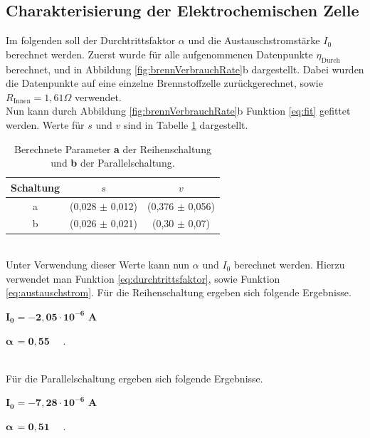 \documentclass[a4paper,usenatbib]{aspdoc}
\begin{document}
        \subsection{Charakterisierung der Elektrochemischen Zelle}\label{subsec:char_zel}
            Im folgenden soll der Durchtrittsfaktor $\alpha$ und die Austauschstromstärke $I_0$ berechnet werden. Zuerst wurde für alle aufgenommenen Datenpunkte $\eta_{\mathrm{Durch}}$ berechnet, und in Abbildung \ref{fig:brennVerbrauchRate}b dargestellt. Dabei wurden die Datenpunkte auf eine einzelne Brennstoffzelle zurückgerechnet, sowie $R_{\mathrm{Innen}} = 1,61 \Omega$ verwendet.
            \\
            Nun kann durch Abbildung \ref{fig:brennVerbrauchRate}b Funktion \ref{eq:fit} gefittet werden. Werte für $s$ und $v$ sind in Tabelle \ref{tab:fittingVal} dargestellt.
            \begin{table}
                \centering
                \begin{tabular}{c|c|c}
                    \multicolumn{1}{c}{Schaltung} & \multicolumn{1}{c}{$s$} & \multicolumn{1}{c}{$v$}\\
                    \cmidrule(lr){1-1}\cmidrule(lr){2-2}\cmidrule(lr){3-3}
                    \toprule
                    a & (0,028 $\pm$ 0,012) & (0,376 $\pm$ 0,056) \\
                    b & (0,026 $\pm$ 0,021) & (0,30 $\pm$ 0,07) \\
                    \bottomrule
                \end{tabular}
                \caption{Berechnete Parameter \textbf{a} der Reihenschaltung und \textbf{b} der Parallelschaltung.}
                \label{tab:fittingVal}
            \end{table}
            \\
            Unter Verwendung dieser Werte kann nun $\alpha$ und $I_0$ berechnet werden. Hierzu verwendet man Funktion \ref{eq:durchtrittsfaktor}, sowie Funktion \ref{eq:austauschstrom}.
            Für die Reihenschaltung ergeben sich folgende Ergebnisse.
            \begin{center}
                $\mathbf{I_0 = -2,05 \cdot 10^{-6}}$ \textbf{A}    
            \end{center}
            \begin{center}
                $\bm{\alpha}\, \mathbf{ = 0,55} \quad$ . 
            \end{center}
            \\
            Für die Parallelschaltung ergeben sich folgende Ergebnisse.
            \begin{center}
                $\mathbf{I_0 = -7,28 \cdot 10^{-6}}$ \textbf{A}    
            \end{center}
            \begin{center}
                $\bm{\alpha}\, \mathbf{ = 0,51} \quad$ . 
            \end{center}
            
\end{document}
